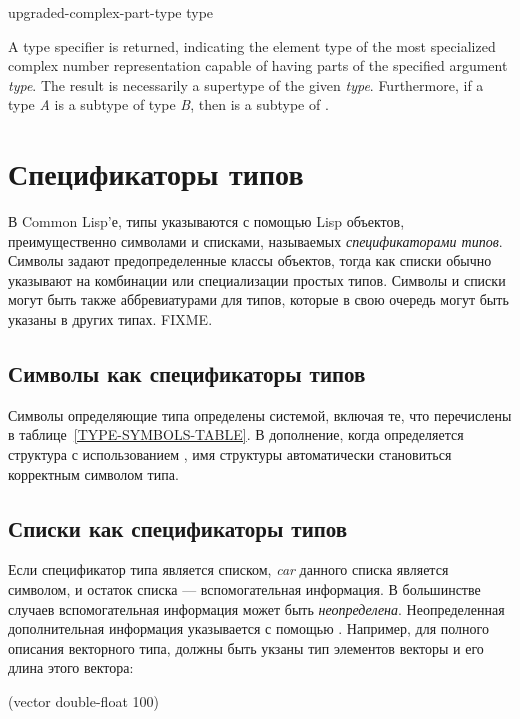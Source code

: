 \begin{new}
\begin{defun}[Function]
upgraded-complex-part-type type

A type specifier is returned, indicating the element type
of the most specialized complex number representation capable of having
parts of the specified argument \emph{type}.
The result is necessarily a supertype of the given \emph{type}.
Furthermore, if a type \emph{A} is a subtype of type \emph{B}, then
 is a subtype of
.
\end{defun}

\end{new}

\else


\chapter{Спецификаторы типов}    %
\label{DTSPEC}

В Common Lisp'е, типы указываются с помощью Lisp объектов, преимущественно
символами и списками, называемых \emph{спецификаторами типов}. Символы задают
предопределенные классы объектов, тогда как списки обычно указывают на
комбинации или специализации простых типов.
Символы и списки могут быть также аббревиатурами для типов, которые в свою
очередь могут быть указаны в других типах. FIXME. 

\section{Символы как спецификаторы типов}

Символы определяющие типа определены системой, включая те, что перечислены в
таблице~\ref{TYPE-SYMBOLS-TABLE}.
В дополнение, когда определяется структура с использованием , имя
структуры автоматически становиться корректным символом типа.

\section{Списки как спецификаторы типов}

Если спецификатор типа является списком, \emph{car} данного списка является
символом, и остаток списка --- вспомогательная информация. В большинстве случаев
вспомогательная информация может быть \emph{неопределена}. Неопределенная
дополнительная информация указывается с помощью \cdf{*}. Например, для полного
описания векторного типа, должны быть укзаны тип элементов векторы и его длина
этого вектора:
\begin{lisp}
(vector double-float 100)
\end{lisp}

